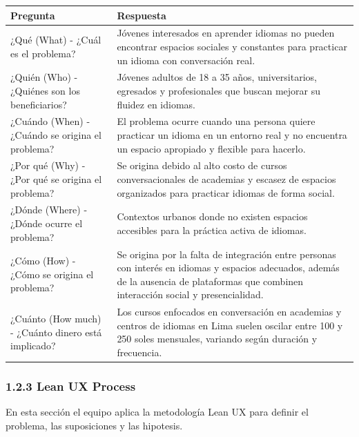 \begin{longtable}{|p{6cm}|p{9cm}|}
\hline
\textbf{Pregunta} & \textbf{Respuesta} \\
\hline

¿Qué (What) - ¿Cuál es el problema?
& Jóvenes interesados en aprender idiomas no pueden encontrar espacios sociales y constantes para practicar un idioma con conversación real. \\
\hline

¿Quién (Who) - ¿Quiénes son los beneficiarios?
& Jóvenes adultos de 18 a 35 años, universitarios, egresados y profesionales que buscan mejorar su fluidez en idiomas. \\
\hline

¿Cuándo (When) - ¿Cuándo se origina el problema?
& El problema ocurre cuando una persona quiere practicar un idioma en un entorno real y no encuentra un espacio apropiado y flexible para hacerlo. \\
\hline

¿Por qué (Why) - ¿Por qué se origina el problema?
& Se origina debido al alto costo de cursos conversacionales de academias y escasez de espacios organizados para practicar idiomas de forma social. \\
\hline

¿Dónde (Where) - ¿Dónde ocurre el problema?
& Contextos urbanos donde no existen espacios accesibles para la práctica activa de idiomas. \\
\hline

¿Cómo (How) - ¿Cómo se origina el problema?
& Se origina por la falta de integración entre personas con interés en idiomas y espacios adecuados, además de la ausencia de plataformas que combinen interacción social y presencialidad. \\
\hline

¿Cuánto (How much) - ¿Cuánto dinero está implicado?
& Los cursos enfocados en conversación en academias y centros de idiomas en Lima suelen oscilar entre 100 y 250 soles mensuales, variando según duración y frecuencia. \\
\hline

\end{longtable}

\subsubsection{1.2.3 Lean UX
Process}\label{report__10-cap1-introduccion.md__lean-ux-process}

En esta sección el equipo aplica la metodología Lean UX para definir el
problema, las suposiciones y las hipotesis.

